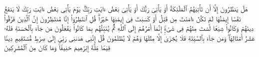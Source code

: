 هَلۡ یَنظُرُونَ إِلَّاۤ أَن تَأۡتِیَهُمُ ٱلۡمَلَٰۤئِكَةُ أَوۡ یَأۡتِیَ رَبُّكَ أَوۡ یَأۡتِیَ بَعۡضُ ءَایَٰتِ رَبِّكَۗ یَوۡمَ یَأۡتِی بَعۡضُ ءَایَٰتِ رَبِّكَ لَا یَنفَعُ نَفۡسًا إِیمَٰنُهَا لَمۡ تَكُنۡ ءَامَنَتۡ مِن قَبۡلُ أَوۡ كَسَبَتۡ فِیۤ إِیمَٰنِهَا خَیۡرࣰاۗ قُلِ ٱنتَظِرُوۤا۟ إِنَّا مُنتَظِرُونَ%
\stopbuffer
\startbuffer[\q:6:159]
إِنَّ ٱلَّذِینَ فَرَّقُوا۟ دِینَهُمۡ وَكَانُوا۟ شِیَعࣰا لَّسۡتَ مِنۡهُمۡ فِی شَیۡءٍۚ إِنَّمَاۤ أَمۡرُهُمۡ إِلَى ٱللَّهِ ثُمَّ یُنَبِّئُهُم بِمَا كَانُوا۟ یَفۡعَلُونَ%
\stopbuffer
\startbuffer[\q:6:160]
مَن جَاۤءَ بِٱلۡحَسَنَةِ فَلَهُۥ عَشۡرُ أَمۡثَالِهَاۖ وَمَن جَاۤءَ بِٱلسَّیِّئَةِ فَلَا یُجۡزَىٰۤ إِلَّا مِثۡلَهَا وَهُمۡ لَا یُظۡلَمُونَ%
\stopbuffer
\startbuffer[\q:6:161]
قُلۡ إِنَّنِی هَدَىٰنِی رَبِّیۤ إِلَىٰ صِرَٰطࣲ مُّسۡتَقِیمࣲ دِینࣰا قِیَمࣰا مِّلَّةَ إِبۡرَٰهِیمَ حَنِیفࣰاۚ وَمَا كَانَ مِنَ ٱلۡمُشۡرِكِینَ%
\stopbuffer
